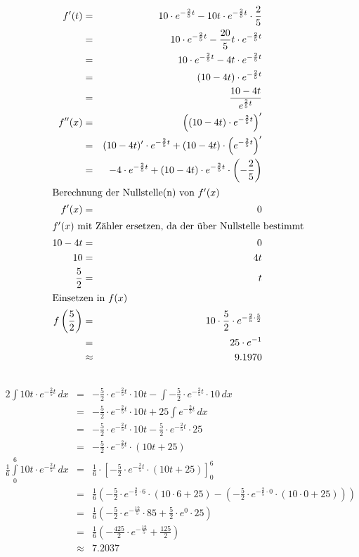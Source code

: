 \documentclass[10pt,a4paper,oneside,ngerman,numbers=noenddot]{scrartcl}
\begin{document}
\subsection{} %
\begin{alignat*}{2}
f'(t) &=& 10 \cdot e^{-\frac{2}{5}t} - 10t \cdot e^{-\frac{2}{5}t} \cdot \frac{2}{5} \\
&=& 10 \cdot e^{-\frac{2}{5}t} - \frac{20}{5}t \cdot e^{-\frac{2}{5}t} \\
&=& 10 \cdot e^{-\frac{2}{5}t} - 4t \cdot e^{-\frac{2}{5}t} \\
&=& (10 - 4t) \cdot e^{-\frac{2}{5}t} \\
&=& \frac{10-4t}{e^{\frac{2}{5}t}} \\
f''(x) &=& \left((10 - 4t) \cdot e^{-\frac{2}{5}t}\right)' \\
&=& (10 - 4t)' \cdot e^{-\frac{2}{5}t} + (10 - 4t) \cdot \left(e^{-\frac{2}{5}t}\right)' \\
&=& -4 \cdot e^{-\frac{2}{5}t} + (10 - 4t) \cdot e^{-\frac{2}{5}t} \cdot \left(-\frac{2}{5}\right) \\
\intertext{Berechnung der Nullstelle(n) von $f'(x)$}
f'(x) &=& 0 \\
\intertext{$f'(x)$ mit Zähler ersetzen, da der über Nullstelle bestimmt}
10-4t &=& 0 \\
10 &=& 4t \\
\frac{5}{2} &=& t \\
\intertext{Einsetzen in $f(x)$}
f\left(\frac{5}{2}\right) &=& 10 \cdot \frac{5}{2} \cdot e^{-\frac{2}{5} \cdot \frac{5}{2}} \\
&=& 25 \cdot e^{-1} \\
&\approx & 9.1970
\end{alignat*}
\subsection{} %
\begin{alignat*}{2}
\int 10t \cdot e^{-\frac{2}{5}t}\,dx &=& -\frac{5}{2}\cdot e^{-\frac{2}{5}t} \cdot 10t - \int -\frac{5}{2} \cdot e^{-\frac{2}{5}t} \cdot 10\,dx \\
&=& -\frac{5}{2}\cdot e^{-\frac{2}{5}t} \cdot 10t + 25 \int e^{-\frac{2}{5}t}\,dx \\
&=& -\frac{5}{2}\cdot e^{-\frac{2}{5}t} \cdot 10t - \frac{5}{2} \cdot e^{-\frac{2}{5}t} \cdot 25   \\
&=& -\frac{5}{2}\cdot e^{-\frac{2}{5}t} \cdot \left( 10t + 25\right) \\
\frac{1}{6} \int\limits_{0}^{6} 10t \cdot e^{-\frac{2}{5}t}\,dx &=& \frac{1}{6} \cdot \left[-\frac{5}{2}\cdot e^{-\frac{2}{5}t} \cdot (10t + 25)\right]_{0}^{6} \\
&=& \frac{1}{6}\left(-\frac{5}{2}\cdot e^{-\frac{2}{5} \cdot 6} \cdot ( 10 \cdot 6 + 25) - \left(-\frac{5}{2}\cdot e^{-\frac{2}{5} \cdot 0} \cdot ( 10 \cdot 0 + 25)\right)\right) \\
&=& \frac{1}{6}\left(-\frac{5}{2}\cdot e^{-\frac{12}{5}} \cdot 85 + \frac{5}{2}\cdot e^{0} \cdot 25\right) \\
&=& \frac{1}{6}\left(-\frac{425}{2}\cdot e^{-\frac{12}{5}} + \frac{125}{2}\right) \\
&\approx & 7.2037
\end{alignat*}
\end{document}
